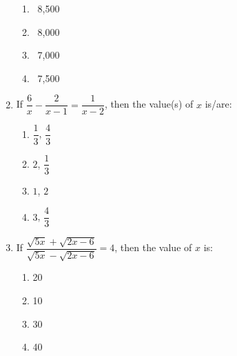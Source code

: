\begin{enumerate}[label=(\roman*)]
        \begin{multicols}{2}
        \begin{enumerate}[label=(\alph*)]
            \item \rupee~8,500
            \item \rupee~8,000
            \item \rupee~7,000
            \item \rupee~7,500
        \end{enumerate}
        \end{multicols}

    \item If $\dfrac{6}{x} - \dfrac{2}{x-1} = \dfrac{1}{x-2}$, then the 
        value(s) of $x$ is/are:

        \begin{multicols}{2}
        \begin{enumerate}[label=(\alph*)]
            \item $\dfrac{1}{3}$, $\dfrac{4}{3}$ 
            \item $2$, $\dfrac{1}{3}$ 
            \item $1$, $2$
            \item $3$, $\dfrac{4}{3}$ 
        \end{enumerate}
        \end{multicols}

    \item If $\dfrac{\sqrt{5x} + \sqrt{2x-6}}{\sqrt{5x} - \sqrt{2x-6}} = 4$, then the value of $x$ is: 

        \begin{multicols}{2}
        \begin{enumerate}[label=(\alph*)]
            \item 20 
            \item 10 
            \item 30 
            \item 40 
        \end{enumerate}
        \end{multicols}

\end{enumerate}

